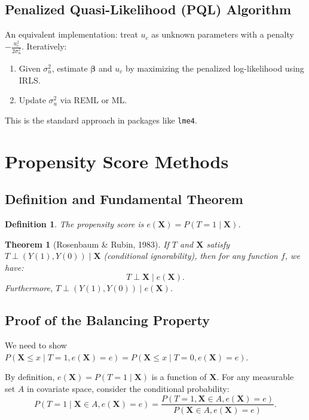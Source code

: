 \documentclass[12pt]{article}
\numberwithin{equation}{section}
\newtheorem{theorem}{Theorem}[section]
\newtheorem{definition}{Definition}[section]
\begin{document}
	\subsection{Penalized Quasi-Likelihood (PQL) Algorithm}
	
	An equivalent implementation: treat $u_c$ as unknown parameters with a penalty $-\frac{u_c^2}{2\sigma_u^2}$. Iteratively:
	\begin{enumerate}
		\item Given $\sigma_u^2$, estimate $\boldsymbol{\beta}$ and $u_c$ by maximizing the penalized log-likelihood using IRLS.
		\item Update $\sigma_u^2$ via REML or ML.
	\end{enumerate}
	
	This is the standard approach in packages like \texttt{lme4}.
	
	\section{Propensity Score Methods}
	
	\subsection{Definition and Fundamental Theorem}
	
	\begin{definition}
		The propensity score is $e(\mathbf{X}) = P(T=1 \mid \mathbf{X})$.
	\end{definition}
	
	\begin{theorem}[Rosenbaum \& Rubin, 1983]
		If $T$ and $\mathbf{X}$ satisfy $T \perp (Y(1), Y(0)) \mid \mathbf{X}$ (conditional ignorability), then for any function $f$, we have:
		\[
		T \perp \mathbf{X} \mid e(\mathbf{X}).
		\]
		Furthermore, $T \perp (Y(1), Y(0)) \mid e(\mathbf{X})$.
	\end{theorem}
	
	\subsection{Proof of the Balancing Property}
	
	We need to show $P(\mathbf{X} \le x \mid T=1, e(\mathbf{X})=e) = P(\mathbf{X} \le x \mid T=0, e(\mathbf{X})=e)$.
	
	By definition, $e(\mathbf{X}) = P(T=1 \mid \mathbf{X})$ is a function of $\mathbf{X}$. For any measurable set $A$ in covariate space, consider the conditional probability:
	\[
	P(T=1 \mid \mathbf{X} \in A, e(\mathbf{X})=e) = \frac{P(T=1, \mathbf{X} \in A, e(\mathbf{X})=e)}{P(\mathbf{X} \in A, e(\mathbf{X})=e)}.
	\]
	
\end{document}
